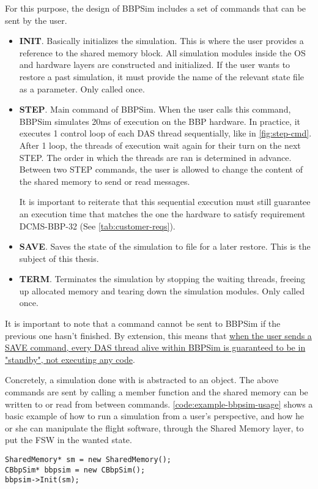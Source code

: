 {For this purpose, the design of BBPSim includes a set of commands that can be sent by the user. 
\begin{itemize}
	\item \textbf{INIT}. Basically initializes the simulation. This is where the user provides a reference to the shared memory block. All simulation modules inside the OS and hardware layers are constructed and initialized. If the user wants to restore a past simulation, it must provide the name of the relevant state file as a parameter. Only called once.
	\item \textbf{STEP}. Main command of BBPSim. When the user calls this command, BBPSim simulates 20ms of execution on the BBP hardware. In practice, it executes 1 control loop of each DAS thread sequentially, like in \autoref{fig:step-cmd}. After 1 loop, the threads of execution wait again for their turn on the next STEP. The order in which the threads are ran is determined in advance. Between two STEP commands, the user is allowed to change the content of the shared memory to send or read messages. \par
	\begin{minipage}{\linewidth}
		\vspace{12pt}
		\centering
		
		\label{fig:step-cmd}
		\vspace{12pt}
	\end{minipage}
	It is important to reiterate that this sequential execution must still guarantee an execution time that matches the one the hardware to satisfy requirement DCMS-BBP-32 (See \autoref{tab:customer-reqs}).
	\item \textbf{SAVE}. Saves the state of the simulation to file for a later restore. This is the subject of this thesis. 
	\item \textbf{TERM}. Terminates the simulation by stopping the waiting threads, freeing up allocated memory and tearing down the simulation modules. Only called once.
\end{itemize}
It is important to note that a command cannot be sent to BBPSim if the previous one hasn't finished. By extension, this means that \ul{when the user sends a SAVE command, every DAS thread alive within BBPSim is guaranteed to be in "standby", not executing any code}. 

Concretely, a simulation done with  is abstracted to an object. The above commands are sent by calling a member function and the shared memory can be written to or read from between commands.  \autoref{code:example-bbpsim-usage} shows a basic example of how to run a simulation from a user's perspective, and how he or she can manipulate the flight software, through the Shared Memory layer, to put the FSW in the wanted state.
\begin{listing}[H]
	\begin{verbatim}
SharedMemory* sm = new SharedMemory();
CBbpSim* bbpsim = new CBbpSim();
bbpsim->Init(sm);


\end{verbatim}
\end{listing}}
